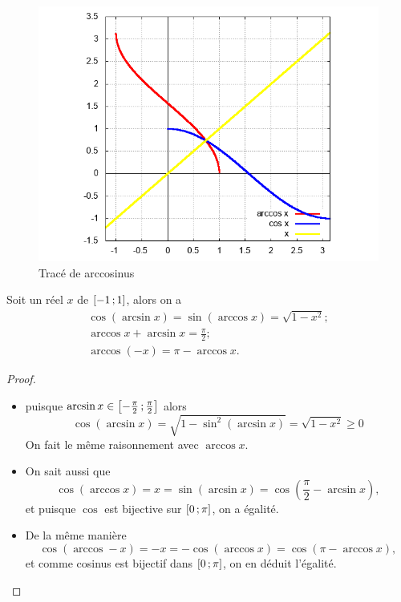 %
\begin{figure}
  \centering
  \includegraphics[scale=0.4,angle=-90]{arccos.png}
  \caption{Tracé de arccosinus}
  \label{fig:tracearccosinus}
\end{figure}
%
\begin{prop}
  Soit un réel $x$ de $\left[ -1 \, ;  1 \right]$, alors on a
  \begin{gather}
    \cos( \arcsin x)=\sin( \arccos x)=\sqrt{1-x^2}; \\
    \arccos x + \arcsin x = \frac{\pi}{2};\\
    \arccos(-x) = \pi - \arccos x.
  \end{gather}
\end{prop}
\begin{proof}
  \begin{itemize}
  \item puisque $\arcsin x \in \left[ -\frac{\pi}{2} \, ;  \frac{\pi}{2} \right]$ alors
    \begin{equation}
      \cos( \arcsin x)=\sqrt{1- \sin^2(\arcsin x)}=\sqrt{1-x^2} \geq 0
    \end{equation}
    On fait le même raisonnement avec $\arccos x$.
  \item On sait aussi que
    \begin{equation}
      \cos( \arccos x) = x = \sin( \arcsin x)=\cos \left( \frac{\pi}{2} - \arcsin x \right),
    \end{equation}
    et puisque $\cos$ est bijective sur $\left[ 0 \, ;  \pi \right]$, on a égalité.
  \item De la même manière
    \begin{equation}
      \cos( \arccos -x)=-x=-\cos( \arccos x)=\cos(\pi - \arccos x),
    \end{equation}
    et comme cosinus est bijectif dans $\left[ 0 \, ;  \pi \right]$, on en déduit l'égalité.
  \end{itemize}
\end{proof}
%
